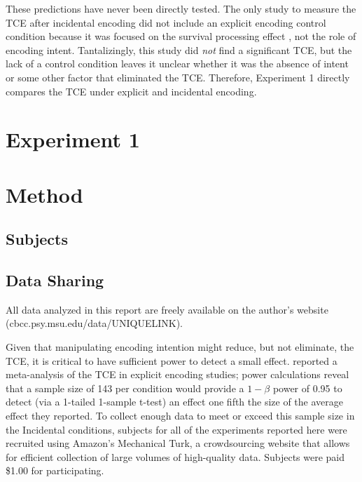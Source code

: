 \documentclass[jou,natbib]{apa6} %
\begin{document}

These predictions have never been directly tested. The only study to measure the TCE after incidental encoding \citep{NairEtal17} did not include an explicit encoding control condition because it was focused on the survival processing effect \citep{NairPand16}, not the role of encoding intent. Tantalizingly, this study did \emph{not} find a significant TCE, but the lack of a control condition leaves it unclear whether it was the absence of intent or some other factor that eliminated the TCE. Therefore, Experiment 1 directly compares the TCE under explicit and incidental encoding.

\section{Experiment 1}

\section{Method}

\newcommand\listlength{16} %
\newcommand\presrate{4 seconds} %
\newcommand\isi{1 second} %
\newcommand\DFRDelay{16 seconds} %
\newcommand\recalltime{75 seconds} %
\newcommand\totalss{XX}
\newcommand\totalexcluded{XX}

\subsection{Subjects}

\subsection{Data Sharing}All data analyzed in this report are freely available on the author's website (cbcc.psy.msu.edu/data/UNIQUELINK).

Given that manipulating encoding intention might reduce, but not eliminate, the TCE, it is critical to have sufficient power to detect a small effect. \citet{SedeEtal10} reported a meta-analysis of the TCE in explicit encoding studies; power calculations reveal that a sample size of 143 per condition would provide a $1-\beta$ power of 0.95 to detect (via a 1-tailed 1-sample t-test) an effect one fifth the size of the average effect they reported. 
To collect enough data to meet or exceed this sample size in the Incidental conditions, subjects for all of the experiments reported here were recruited using Amazon's Mechanical Turk, a crowdsourcing website that allows for efficient collection of large volumes of high-quality data. Subjects were paid \$1.00 for participating.
\end{document}
